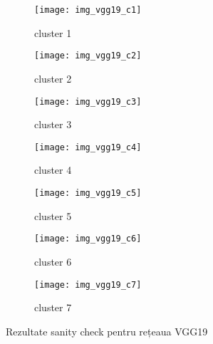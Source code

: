 \begin{figure}[!h]
  \centering
  \begin{subfigure}[b]{0.50\textwidth}
    \texttt{[image: img\_vgg19\_c1]}
    \caption{cluster 1}
  \end{subfigure}
  \hfill
  \begin{subfigure}[b]{0.50\textwidth}
    \texttt{[image: img\_vgg19\_c2]}
    \caption{cluster 2}
  \end{subfigure}
   \hfill
  \begin{subfigure}[b]{0.50\textwidth}
    \texttt{[image: img\_vgg19\_c3]}
    \caption{cluster 3}
  \end{subfigure}
  \hfill
  \begin{subfigure}[b]{0.50\textwidth}
    \texttt{[image: img\_vgg19\_c4]}
    \caption{cluster 4}
  \end{subfigure}
  \hfill
  \begin{subfigure}[b]{0.50\textwidth}
    \texttt{[image: img\_vgg19\_c5]}
    \caption{cluster 5}
  \end{subfigure}
  \hfill
  \begin{subfigure}[b]{0.50\textwidth}
    \texttt{[image: img\_vgg19\_c6]}
    \caption{cluster 6}
  \end{subfigure}
    \hfill
  \begin{subfigure}[b]{0.50\textwidth}
    \texttt{[image: img\_vgg19\_c7]}
    \caption{cluster 7}
  \end{subfigure}
  \caption[Rezultate sanity check pentru rețeaua VGG19]{Rezultate sanity check pentru rețeaua VGG19}
\end{figure}

